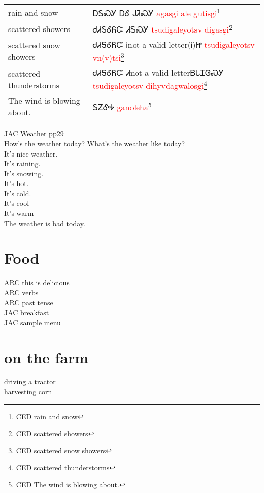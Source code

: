 \begin{minipage}{\linewidth}
\begin{tabular}{p{3cm} p{11cm}}
rain and snow & ᎠᎦᏍᎩ ᎠᎴ ᎫᏘᏍᎩ 
 \newline \textcolor{red}{agasgi ale gutisgi}\footnote{\href{https://cherokeedictionary.net/share/101983}{CED rain and snow}}\\
scattered showers & ᏧᏗᎦᎴᏲᏨ ᏗᎦᏍᎩ 
 \newline \textcolor{red}{tsudigaleyotsv digasgi}\footnote{\href{https://cherokeedictionary.net/share/101984}{CED scattered showers}}\\
scattered snow showers & ᏧᏗᎦᎴᏲᏨ Ꭵnot a valid letter(Ꭵ)Ꮵ 
 \newline \textcolor{red}{tsudigaleyotsv vn(v)tsi}\footnote{\href{https://cherokeedictionary.net/share/101985}{CED scattered snow showers}}\\
scattered thunderstorms & ᏧᏗᎦᎴᏲᏨ  Ꮧnot a valid letterᏴᏓᏆᎶᏍᎩ 
 \newline \textcolor{red}{tsudigaleyotsv  dihyvdagwalosgi}\footnote{\href{https://cherokeedictionary.net/share/101986}{CED scattered thunderstorms}}\\
The wind is blowing about. & ᎦᏃᎴᎭ 
 \newline \textcolor{red}{ganoleha}\footnote{\href{https://cherokeedictionary.net/share/101987}{CED The wind is blowing about.}}\\
\end{tabular}
\end{minipage}

JAC Weather pp29\\
How's the weather today? What's the weather like today?\\
It's nice weather.\\
It's raining.\\
It's snowing.\\
It's hot.\\
It's cold.\\
It's cool\\
It's warm\\
The weather is bad today.\\
\chapter{Food}
ARC this is delicious\\
ARC verbs\\
ARC past tense\\
JAC breakfast\\
JAC sample menu\\
\chapter{on the farm}
driving a tractor\\
harvesting corn\\
